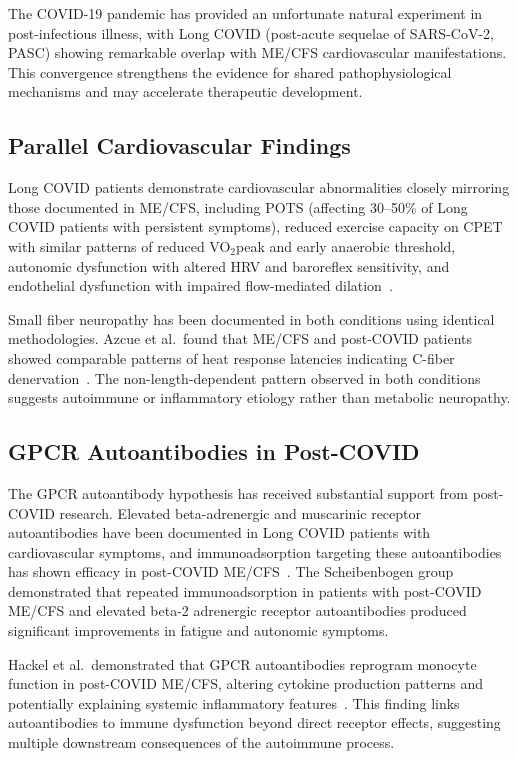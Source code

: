 The COVID-19 pandemic has provided an unfortunate natural experiment in post-infectious illness, with Long COVID (post-acute sequelae of SARS-CoV-2, PASC) showing remarkable overlap with ME/CFS cardiovascular manifestations. This convergence strengthens the evidence for shared pathophysiological mechanisms and may accelerate therapeutic development.

\subsection{Parallel Cardiovascular Findings}

Long COVID patients demonstrate cardiovascular abnormalities closely mirroring those documented in ME/CFS, including POTS (affecting 30--50\% of Long COVID patients with persistent symptoms), reduced exercise capacity on CPET with similar patterns of reduced VO$_2$peak and early anaerobic threshold, autonomic dysfunction with altered HRV and baroreflex sensitivity, and endothelial dysfunction with impaired flow-mediated dilation~\cite{Devigili2023SFN}.

Small fiber neuropathy has been documented in both conditions using identical methodologies. Azcue et al.\ found that ME/CFS and post-COVID patients showed comparable patterns of heat response latencies indicating C-fiber denervation~\cite{Azcue2023sfn}. The non-length-dependent pattern observed in both conditions suggests autoimmune or inflammatory etiology rather than metabolic neuropathy.

\subsection{GPCR Autoantibodies in Post-COVID}

The GPCR autoantibody hypothesis has received substantial support from post-COVID research. Elevated beta-adrenergic and muscarinic receptor autoantibodies have been documented in Long COVID patients with cardiovascular symptoms, and immunoadsorption targeting these autoantibodies has shown efficacy in post-COVID ME/CFS~\cite{Stein2024immunoadsorption}. The Scheibenbogen group demonstrated that repeated immunoadsorption in patients with post-COVID ME/CFS and elevated beta-2 adrenergic receptor autoantibodies produced significant improvements in fatigue and autonomic symptoms.

Hackel et al.\ demonstrated that GPCR autoantibodies reprogram monocyte function in post-COVID ME/CFS, altering cytokine production patterns and potentially explaining systemic inflammatory features~\cite{Hackel2025monocyte}. This finding links autoantibodies to immune dysfunction beyond direct receptor effects, suggesting multiple downstream consequences of the autoimmune process.

